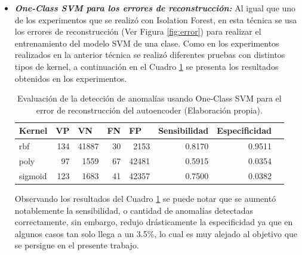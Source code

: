 \begin{itemize}
\item \textbf{\textit{One-Class SVM para los errores de reconstrucci\'{o}n: }}Al igual que uno de los experimentos que se realiz\'{o} con Isolation Forest, en esta t\'{e}cnica se usa los errores de reconstrucci\'{o}n (Ver Figura \ref{fig:error}) para realizar el entrenamiento del modelo SVM de una clase. Como en los experimentos realizados en la anterior t\'{e}cnica se realiz\'{o} diferentes pruebas con distintos tipos de kernel, a continuaci\'{o}n en el Cuadro \ref{table:evaluacion_SVM_error} se presenta los resultados obtenidos en los experimentos.

\begin{table}[H]
\centering
\begin{center}
\begin{tabular}{|l|r|r|r|r|r|r|r|}
\hline
\textbf{Kernel} & \multicolumn{1}{l|}{\textbf{VP}} & \multicolumn{1}{l|}{\textbf{VN}}& \multicolumn{1}{l|}{\textbf{FN}}& \multicolumn{1}{l|}{\textbf{FP}} & \multicolumn{1}{l|}{\textbf{Sensibilidad}} & \multicolumn{1}{l|}{\textbf{Especificidad}} \\ \hline
rbf & \cellcolor[HTML]{AADD99} 134 & \cellcolor[HTML]{AADD99} 41887 & \cellcolor[HTML]{FFCE93} 30 & \cellcolor[HTML]{FFCE93} 2153 & 0.8170 & 0.9511 \\ \hline
poly & \cellcolor[HTML]{AADD99} 97 & \cellcolor[HTML]{AADD99} 1559 & \cellcolor[HTML]{FFCE93} 67 & \cellcolor[HTML]{FFCE93} 42481 & 0.5915 & 0.0354 \\ \hline
sigmoid & \cellcolor[HTML]{AADD99} 123 & \cellcolor[HTML]{AADD99} 1683 & \cellcolor[HTML]{FFCE93} 41 & \cellcolor[HTML]{FFCE93} 42357 & 0.7500 & 0.0382 \\ \hline
\end{tabular}
\end{center}
\caption{Evaluaci\'{o}n de la detecci\'{o}n de anomal\'{i}as usando One-Class SVM para el error de reconstrucci\'{o}n del autoencoder (Elaboraci\'{o}n propia).}

\label{table:evaluacion_SVM_error}
\end{table}


Observando los resultados del Cuadro \ref{table:evaluacion_SVM_error} se puede notar que se aument\'{o} notablemente la sensibilidad, o cantidad de anomal\'{i}as detectadas correctamente, sin embargo, redujo dr\'{a}sticamente la especificidad ya que en algunos casos tan solo llega a un 3.5\%, lo cual es muy alejado al objetivo que se persigue en el presente trabajo.

\end{itemize}

